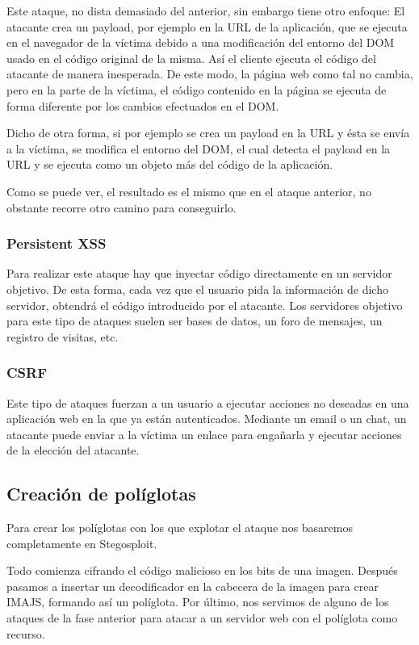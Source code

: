 Este ataque, no dista demasiado del anterior, sin embargo tiene otro enfoque: El atacante crea un payload, por ejemplo en la URL de la aplicación, que se ejecuta en el navegador de la víctima debido a una modificación del entorno del DOM usado en el código original de la misma. Así el cliente ejecuta el código del atacante de manera inesperada. De este modo, la página web como tal no cambia, pero en la parte de la víctima, el código contenido en la página se ejecuta de forma diferente por los cambios efectuados en el DOM.

Dicho de otra forma, si por ejemplo se crea un payload en la URL y ésta se envía a la víctima, se modifica el entorno del DOM, el cual detecta el payload en la URL y se ejecuta como un objeto más del código de la aplicación.

Como se puede ver, el resultado es el mismo que en el ataque anterior, no obstante recorre otro camino para conseguirlo. %

\subsubsection{Persistent XSS}

Para realizar este ataque hay que inyectar código directamente en un servidor objetivo. De esta forma, cada vez que el usuario pida la información de dicho servidor, obtendrá el código introducido por el atacante. Los servidores objetivo para este tipo de ataques suelen ser bases de datos, un foro de mensajes, un registro de visitas, etc. %

\subsubsection{CSRF}

Este tipo de ataques fuerzan a un usuario a ejecutar acciones no deseadas en una aplicación web en la que ya están autenticados. Mediante un email o un chat, un atacante puede enviar a la víctima un enlace para engañarla y ejecutar acciones de la elección del atacante. %

\subsection{Creación de políglotas}

Para crear los políglotas con los que explotar el ataque nos basaremos completamente en Stegosploit.

Todo comienza cifrando el código malicioso en los bits de una imagen. Después pasamos a insertar un decodificador en la cabecera de la imagen para crear IMAJS, formando así un políglota. Por último, nos servimos de alguno de los ataques de la fase anterior para atacar a un servidor web con el políglota como recurso.

